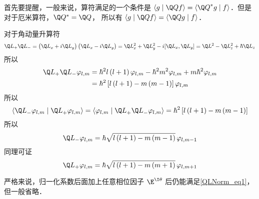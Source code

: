 


首先要提醒，一般来说，算符满足的一个条件是 $\left\langle {g}
 \mathrel{\left | {\vphantom {g {\Q Qf}}}
 \right. \kern-\nulldelimiterspace}
 {{\Q Qf}} \right\rangle  = \left\langle {{{{\Q Q}^ * }g}}
 \mathrel{\left | {\vphantom {{{{\Q Q}^ * }g} f}}
 \right. \kern-\nulldelimiterspace}
 {f} \right\rangle $．但是对于厄米算符，${\Q Q^ * } = \Q Q$， 所以有 $\left\langle {g}
 \mathrel{\left | {\vphantom {g {\Q Qf}}}
 \right. \kern-\nulldelimiterspace}
 {{\Q Qf}} \right\rangle  = \left\langle {{\Q Qg}}
 \mathrel{\left | {\vphantom {{\Q Qg} f}}
 \right. \kern-\nulldelimiterspace}
 {f} \right\rangle $．

对于角动量升算符
\begin{equation}
{\Q L_ + }{\Q L_ - } = \left( {{{\Q L}_x} + i{{\Q L}_y}} \right)\left( {{{\Q L}_x} - i{{\Q L}_y}} \right) = \Q L_x^2 + \Q L_y^2 - i[{\Q L_x},{\Q L_y}] = {\Q L^2} - \Q L_z^2 + \hbar {\Q L_z}
\end{equation} 
所以
\begin{equation}\begin{aligned}
{\Q L_ + }{\Q L_ - }{\varphi_{l,m}} &= {\hbar ^2}l\left( {l + 1} \right){\varphi_{l,m}} - {\hbar ^2}{m^2}{\varphi_{l,m}} + m{\hbar ^2}{\varphi_{l,m}} \\
&= {\hbar ^2}\left[ {l\left( {l + 1} \right) - m\left( {m - 1} \right)} \right]{\varphi_{l,m}}
\end{aligned}\end{equation} 
所以
\begin{equation}\label{QLNorm_eq1}
\left\langle {{{\Q L}_ - }{\varphi_{l,m}}}
 \mathrel{\left | {\vphantom {{{{\Q L}_ - }{\varphi_{l,m}}} {{{\Q L}_ + }{\varphi_{l,m}}}}}
 \right. \kern-\nulldelimiterspace}
 {{{\Q L}_ + }{\varphi_{l,m}}} \right\rangle  = \left\langle {\varphi_{l,m}}
 \mathrel{\left | {\vphantom {{\varphi_{l,m}} {{{\Q L}_ + }{{\Q L}_ - }{\varphi_{l,m}}}}}
 \right. \kern-\nulldelimiterspace}
 {{{\Q L}_ + }{{\Q L}_ - }{\varphi_{l,m}}} \right\rangle  = {\hbar ^2}\left[ {l\left( {l + 1} \right) - m\left( {m - 1} \right)} \right]
\end{equation} 
所以
\begin{equation}
{\Q L_ - }{\varphi_{l,m}} = \hbar \sqrt {l\left( {l + 1} \right) - m\left( {m - 1} \right)} \,{\varphi_{l,m - 1}}
\end{equation}
同理可证
\begin{equation}
{\Q L_ + }{\varphi_{l,m}} = \hbar \sqrt {l\left( {l + 1} \right) - m\left( {m + 1} \right)} \,{\varphi_{l,m + 1}}
\end{equation} 

严格来说，归一化系数后面加上任意相位因子 ${\E^{\I \theta }}$ 后仍能满足\autoref{QLNorm_eq1}， 但一般省略．



